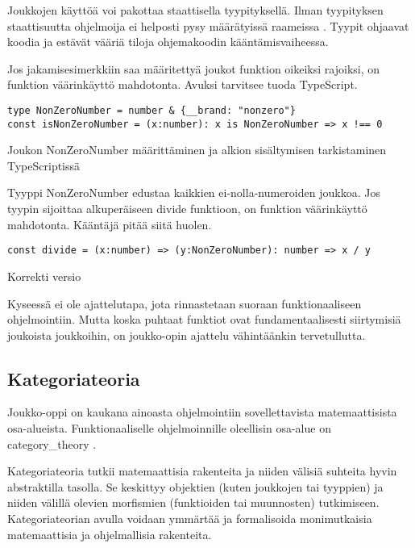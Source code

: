 Joukkojen käyttöä voi pakottaa staattisella tyypityksellä. Ilman tyypityksen staattisuutta ohjelmoija ei helposti pysy määrätyissä raameissa \cite[44]{cantarella_fp_haitat}. Tyypit ohjaavat koodia ja estävät vääriä tiloja ohjemakoodin kääntämisvaiheessa.

Jos jakamisesimerkkiin saa määritettyä joukot funktion oikeiksi rajoiksi, on funktion väärinkäyttö mahdotonta. Avuksi tarvitsee tuoda TypeScript.

\begin{code}
	\begin{verbatim}
type NonZeroNumber = number & {__brand: "nonzero"}
const isNonZeroNumber = (x:number): x is NonZeroNumber => x !== 0
\end{verbatim}
	\label{code:ts_set_theory_5}
	\caption{Joukon NonZeroNumber määrittäminen ja alkion sisältymisen tarkistaminen TypeScriptissä}
\end{code}

Tyyppi NonZeroNumber edustaa kaikkien ei-nolla-numeroiden joukkoa. Jos tyypin sijoittaa alkuperäiseen divide funktioon, on funktion väärinkäyttö mahdotonta. Kääntäjä pitää siitä huolen.


\begin{code}
	\begin{verbatim}
const divide = (x:number) => (y:NonZeroNumber): number => x / y
\end{verbatim}
	\caption{Korrekti versio}
	\label{code:ts_set_theory_6}
\end{code}

Kyseessä ei ole ajattelutapa, jota rinnastetaan suoraan funktionaaliseen ohjelmointiin. Mutta koska puhtaat funktiot ovat fundamentaalisesti siirtymisiä joukoista joukkoihin, on joukko-opin ajattelu vähintäänkin tervetullutta.



\subsection{Kategoriateoria}


Joukko-oppi on kaukana ainoasta ohjelmointiin sovellettavista matemaattisista osa-alueista. Funktionaaliselle ohjelmoinnille oleellisin osa-alue on \gls{category_theory} \cite{bartosz_category_for_progamers,promises-spec-94}.

Kategoriateoria tutkii matemaattisia rakenteita ja niiden välisiä suhteita hyvin abstraktilla tasolla. Se keskittyy objektien (kuten joukkojen tai tyyppien) ja niiden välillä olevien morfismien (funktioiden tai muunnosten) tutkimiseen. Kategoriateorian avulla voidaan ymmärtää ja formalisoida monimutkaisia matemaattisia ja ohjelmallisia rakenteita. \cite{bartosz_category_for_progamers,promises-spec-94,category_theory}

